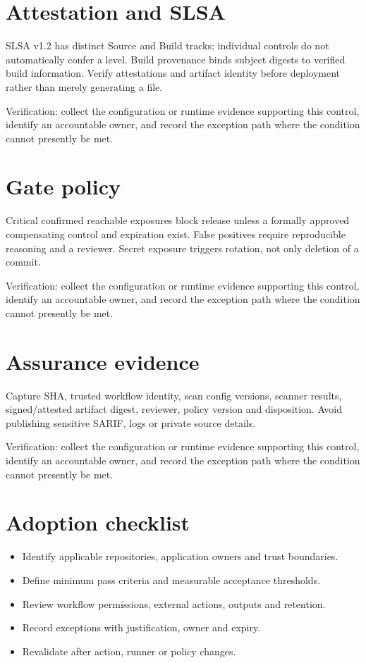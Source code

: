 \documentclass[11pt,letterpaper]{article}
\begin{document}
\section{Attestation and SLSA}
SLSA v1.2 has distinct Source and Build tracks; individual controls do not automatically confer a level. Build provenance binds subject digests to verified build information. Verify attestations and artifact identity before deployment rather than merely generating a file.

Verification: collect the configuration or runtime evidence supporting this control, identify an accountable owner, and record the exception path where the condition cannot presently be met.

\section{Gate policy}
Critical confirmed reachable exposures block release unless a formally approved compensating control and expiration exist. False positives require reproducible reasoning and a reviewer. Secret exposure triggers rotation, not only deletion of a commit.

Verification: collect the configuration or runtime evidence supporting this control, identify an accountable owner, and record the exception path where the condition cannot presently be met.

\section{Assurance evidence}
Capture SHA, trusted workflow identity, scan config versions, scanner results, signed/attested artifact digest, reviewer, policy version and disposition. Avoid publishing sensitive SARIF, logs or private source details.

Verification: collect the configuration or runtime evidence supporting this control, identify an accountable owner, and record the exception path where the condition cannot presently be met.

\section{Adoption checklist}
\begin{itemize}
\item Identify applicable repositories, application owners and trust boundaries.
\item Define minimum pass criteria and measurable acceptance thresholds.
\item Review workflow permissions, external actions, outputs and retention.
\item Record exceptions with justification, owner and expiry.
\item Revalidate after action, runner or policy changes.
\end{itemize}
\end{document}
